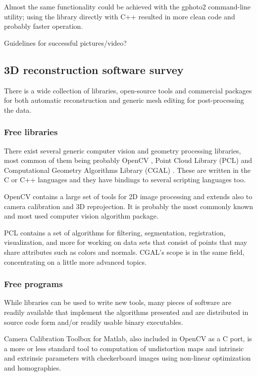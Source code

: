 Almost the same functionality could be achieved with the gphoto2 command-line utility; using the library directly with C++ resulted in more clean code and probably faster operation.

Guidelines for successful pictures/video?


\subsection{3D reconstruction software survey} %

 There is a wide collection of libraries, open-source tools and commercial packages for both automatic reconstruction and generic mesh editing for post-processing the data.

\subsubsection{Free libraries} %

There exist several generic computer vision and geometry processing libraries, most common of them being probably OpenCV \cite{opencv}, Point Cloud Library (PCL) \cite{pcl} and Computational Geometry Algorithms Library (CGAL) \cite{cgal}. These are written in the C or C++ languages and they have bindings to several scripting languages too.

OpenCV contains a large set of tools for 2D image processing and extends also to camera calibration and 3D reprojection.
It is probably the most commonly known and most used computer vision algorithm package.

PCL contains a set of algorithms for filtering, segmentation, registration, visualization, and more for working on data sets that consist of points that may share attributes such as colors and normals. CGAL's scope is in the same field, concentrating on a little more advanced topics.


\subsubsection{Free programs} %

While libraries can be used to write new tools, many pieces of software are readily available that implement the algorithms presented and are distributed in source code form and/or readily usable binary executables.

Camera Calibration Toolbox for Matlab, also included in OpenCV as a C port, is a more or less standard tool to computation of undistortion maps and intrinsic and extrinsic parameters with checkerboard images using non-linear optimization and homographies. \cite{camcalmatlab}

